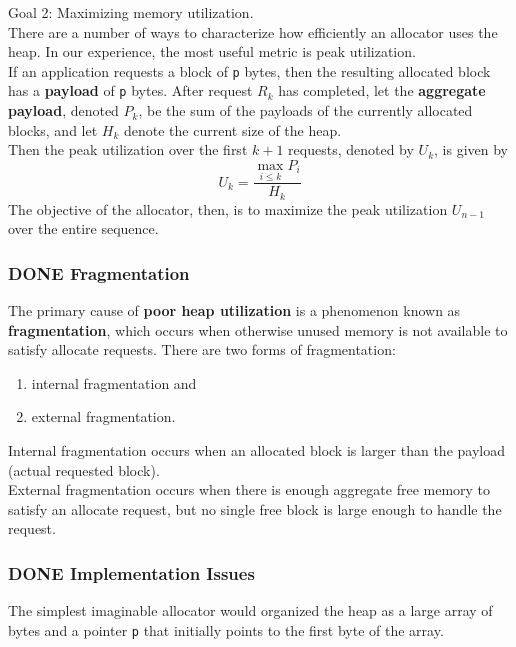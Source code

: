 \documentclass[11pt]{article}
\begin{document}
Goal 2: Maximizing memory utilization.\\
There are a number of ways to characterize how efficiently an allocator uses the heap. In our experience, the most useful metric is peak utilization.\\
If an application requests a block of \texttt{p} bytes, then the resulting allocated block has a \textbf{payload} of \texttt{p} bytes. After request \(R_k\) has completed, let the \textbf{aggregate payload}, denoted \(P_k\), be the sum of the payloads of the currently allocated blocks, and let \(H_k\) denote the current size of the heap.\\
Then the peak utilization over the first \(k+1\) requests, denoted by \(U_k\), is given by\\
\begin{equation}
U_k = \frac{\max_{i\le k} P_i}{H_k}
\end{equation}
The objective of the allocator, then, is to maximize the peak utilization \(U_{n−1}\) over the entire sequence.\\

\subsubsection{{\bfseries\sffamily DONE} Fragmentation}
\label{sec:orga8956fa}
The primary cause of \textbf{poor heap utilization} is a phenomenon known as \textbf{fragmentation}, which occurs when otherwise unused memory is not available to satisfy allocate requests. There are two forms of fragmentation:\\
\begin{enumerate}
\item internal fragmentation and\\
\item external fragmentation.\\
\end{enumerate}

Internal fragmentation occurs when an allocated block is larger than the payload (actual requested block).\\

External fragmentation occurs when there is enough aggregate free memory to satisfy an allocate request, but no single free block is large enough to handle the request.\\

\subsubsection{{\bfseries\sffamily DONE} Implementation Issues}
\label{sec:orgd9b5430}
The simplest imaginable allocator would organized the heap as a large array of bytes and a pointer \texttt{p} that initially points to the first byte of the array.\\
\end{document}
